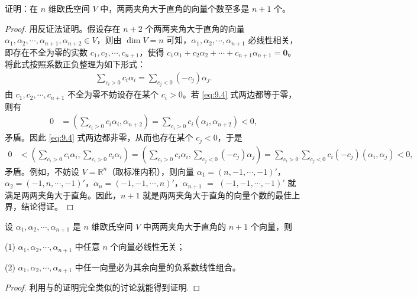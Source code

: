 \documentclass[../../main.tex]{subfiles}
\begin{document}
\begin{proposition}\label{proposition:例9.6}
证明：在 $n$ 维欧氏空间 $V$ 中，两两夹角大于直角的向量个数至多是 $n + 1$ 个。
\end{proposition}
\begin{proof}
用反证法证明。假设存在 $n + 2$ 个两两夹角大于直角的向量 $\alpha_1,\alpha_2,\cdots,\alpha_{n + 1},\alpha_{n + 2}\in V$，则由 $\dim V = n$ 可知，$\alpha_1,\alpha_2,\cdots,\alpha_{n + 1}$ 必线性相关，即存在不全为零的实数 $c_1,c_2,\cdots,c_{n + 1}$，使得 $c_1\alpha_1 + c_2\alpha_2 + \cdots + c_{n + 1}\alpha_{n + 1} = \mathbf{0}$。将此式按照系数正负整理为如下形式：
\begin{align}
\sum_{c_i > 0}c_i\alpha_i = \sum_{c_j < 0}(-c_j)\alpha_j.\label{eq:9.4}
\end{align}
由 $c_1,c_2,\cdots,c_{n + 1}$ 不全为零不妨设存在某个 $c_i > 0$。若 \eqref{eq:9.4} 式两边都等于零，则有
\begin{align*}
0&=(\sum_{c_i > 0}c_i\alpha_i,\alpha_{n + 2})=\sum_{c_i > 0}c_i(\alpha_i,\alpha_{n + 2})<0,
\end{align*}
矛盾。因此 \eqref{eq:9.4} 式两边都非零，从而也存在某个 $c_j < 0$，于是
\begin{align*}
0&<(\sum_{c_i > 0}c_i\alpha_i,\sum_{c_i > 0}c_i\alpha_i)=(\sum_{c_i > 0}c_i\alpha_i,\sum_{c_j < 0}(-c_j)\alpha_j)=\sum_{c_i > 0}\sum_{c_j < 0}c_i(-c_j)(\alpha_i,\alpha_j)<0,
\end{align*}
矛盾。例如，不妨设 $V = \mathbb{R}^n$（取标准内积），则向量 $\alpha_1 = (n,-1,\cdots,-1)'$，$\alpha_2 = (-1,n,\cdots,-1)'$，$\alpha_n = (-1,-1,\cdots,n)'$，$\alpha_{n + 1}$ $=$ $(-1,-1,\cdots,-1)'$ 就满足两两夹角大于直角。因此，$n + 1$ 就是两两夹角大于直角的向量个数的最佳上界，结论得证。 

\end{proof}

\begin{corollary}\label{corollary:例9.6}
设 $\alpha_1,\alpha_2,\cdots,\alpha_{n + 1}$ 是 $n$ 维欧氏空间 $V$ 中两两夹角大于直角的 $n + 1$ 个向量，则

(1) $\alpha_1,\alpha_2,\cdots,\alpha_{n + 1}$ 中任意 $n$ 个向量必线性无关；

(2) $\alpha_1,\alpha_2,\cdots,\alpha_{n + 1}$ 中任一向量必为其余向量的负系数线性组合。
\end{corollary}
\begin{proof}
利用与的证明完全类似的讨论就能得到证明.

\end{proof}
\end{document}
